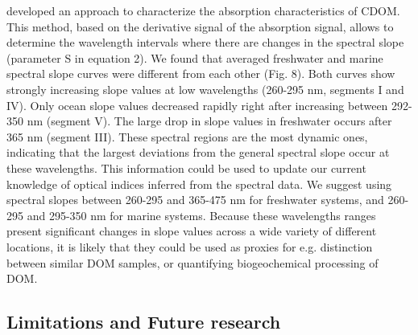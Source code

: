 \citet{Loiselle2009} developed an approach to characterize the absorption characteristics of CDOM. This method, based on the derivative signal of the absorption signal, allows to determine the wavelength intervals where there are changes in the spectral slope (parameter S in equation 2). We found that averaged freshwater and marine spectral slope curves were different from each other (Fig. 8). Both curves show strongly increasing slope values at low wavelengths (260-295 nm, segments I and IV). Only ocean slope values decreased rapidly right after increasing between 292-350 nm (segment V). The large drop in slope values in freshwater occurs after 365 nm (segment III). These spectral regions are the most dynamic ones, indicating that the largest deviations from the general spectral slope occur at these wavelengths. This information could be used to update our current knowledge of optical indices inferred from the spectral data. We suggest using spectral slopes between 260-295 and 365-475 nm for freshwater systems, and 260-295 and 295-350 nm for marine systems. Because these wavelengths ranges present significant changes in slope values across a wide variety of different locations, it is likely that they could be used as proxies for e.g. distinction between similar DOM samples, or quantifying biogeochemical processing of DOM.

\subsection*{Limitations and Future research}

